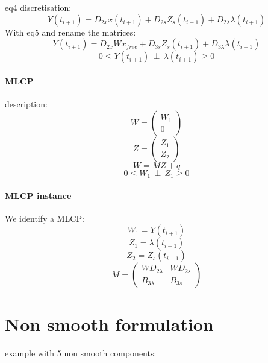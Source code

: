 \documentclass[10pt]{article}
\begin{document}
eq4 discretisation:
\[Y(t_{i+1})=D_{2x}x(t_{i+1})+D_{2s}Z_{s}(t_{i+1}) +D_{2\lambda}\lambda(t_{i+1})\]
With eq5 and rename the matrices:
\[Y(t_{i+1})=D_{2x}Wx_{free}+D_{3s}Z_{s}(t_{i+1})+D_{3\lambda}\lambda(t_{i+1})\]
\[0 \leq Y(t_{i+1}) \, \perp \, \lambda(t_{i+1}) \geq 0\]

\paragraph{MLCP}
description:\\

\[W=\left(\begin{array}{c}W_{1}\\0\end{array}\right)\]
\[Z=\left(\begin{array}{c}Z_{1}\\Z_{2}\end{array}\right)\]
\[W=MZ+q\]
\[0 \leq W_{1} \, \perp \, Z_{1} \geq 0\]
\paragraph{MLCP instance}
We identify a MLCP:\\
\[W_{1} = Y(t_{i+1})\]
\[Z_{1} = \lambda(t_{i+1})\]
\[Z_{2} = Z_{s}(t_{i+1})\]
\[M = \left(\begin{array}{cc}
  WD_{2\lambda}&WD_{2s}\\
B_{3\lambda}&B_{3s}
\end{array}\right)\]
\newpage
\section{Non smooth formulation}
example with 5 non smooth components:\\
\end{document}
